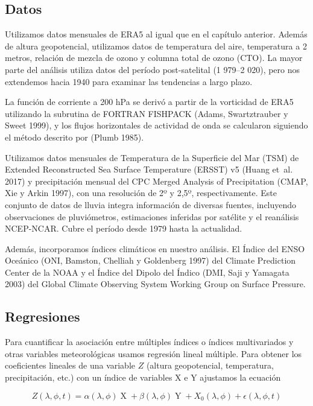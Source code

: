 \documentclass[12pt,oneside,a4paper]{reedthesis}
\begin{document}
\hypertarget{datos-1}{%
\subsection{Datos}\label{datos-1}}

Utilizamos datos mensuales de ERA5 al igual que en el capítulo anterior.
Además de altura geopotencial, utilizamos datos de temperatura del aire, temperatura a 2 metros, relación de mezcla de ozono y columna total de ozono (CTO).
La mayor parte del análisis utiliza datos del período post-satelital (1 979--2 020), pero nos extendemos hacia 1940 para examinar las tendencias a largo plazo.

La función de corriente a 200 hPa se derivó a partir de la vorticidad de ERA5 utilizando la subrutina de FORTRAN FISHPACK (Adams, Swartztrauber y Sweet 1999), y los flujos horizontales de actividad de onda se calcularon siguiendo el método descrito por (Plumb 1985).

Utilizamos datos mensuales de Temperatura de la Superficie del Mar (TSM) de Extended Reconstructed Sea Surface Temperature (ERSST) v5 (Huang et~al. 2017) y precipitación mensual del CPC Merged Analysis of Precipitation (CMAP, Xie y Arkin 1997), con una resolución de 2º y 2,5º, respectivamente.
Este conjunto de datos de lluvia integra información de diversas fuentes, incluyendo observaciones de pluviómetros, estimaciones inferidas por satélite y el reanálisis NCEP-NCAR.
Cubre el período desde 1979 hasta la actualidad.

Además, incorporamos índices climáticos en nuestro análisis.
El Índice del ENSO Oceánico (ONI, Bamston, Chelliah y Goldenberg 1997) del Climate Prediction Center de la NOAA y el Índice del Dipolo del Índico (DMI, Saji y Yamagata 2003) del Global Climate Observing System Working Group on Surface Pressure.

\hypertarget{regresiones}{%
\subsection{Regresiones}\label{regresiones}}

Para cuantificar la asociación entre múltiples índices o índices multivariados y otras variables meteorológicas usamos regresión lineal múltiple.
Para obtener los coeficientes lineales de una variable \(Z\) (altura geopotencial, temperatura, precipitación, etc.) con un índice de variables X e Y ajustamos la ecuación

\begin{equation}
Z(\lambda, \phi, t) = \alpha(\lambda, \phi) \operatorname{X} + \beta(\lambda, \phi) \operatorname{Y} + X_0(\lambda, \phi) + \epsilon(\lambda, \phi, t)
\label{eq:multiple-regression-sam}
\end{equation}
\end{document}
